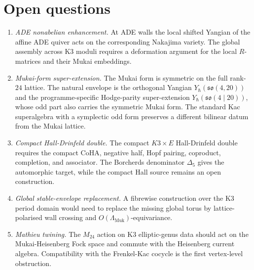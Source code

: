 \documentclass[11pt]{article}
\theoremstyle{definition}
\newcommand{\Lmuk}{\Lambda_{\mathrm{Muk}}}
\begin{document}
\section{Open questions}
\label{sec:open-questions}

\begin{enumerate}
\item \emph{ADE nonabelian enhancement.}
At ADE walls the local shifted Yangian of the affine ADE quiver acts on
the corresponding Nakajima variety. The global assembly across K3 moduli
requires a deformation argument for the local $R$-matrices and their
Mukai embeddings.

\item \emph{Mukai-form super-extension.}
The Mukai form is symmetric on the full rank-$24$ lattice. The natural
envelope is the orthogonal Yangian $Y_\hbar(\mathfrak{so}(4,20))$ and
the programme-specific Hodge-parity super-extension
$Y_\hbar(\mathfrak{so}(4\mid20))$, whose odd part also carries the
symmetric Mukai form. The standard Kac superalgebra with a symplectic odd
form preserves a different bilinear datum from the Mukai lattice.

\item \emph{Compact Hall-Drinfeld double.}
The compact $K3\times E$ Hall-Drinfeld double requires the compact CoHA,
negative half, Hopf pairing, coproduct, completion, and associator. The
Borcherds denominator $\Delta_5$ gives the automorphic target, while the
compact Hall source remains an open construction.

\item \emph{Global stable-envelope replacement.}
A fibrewise construction over the K3 period domain would need to replace
the missing global torus by lattice-polarised wall crossing and
$O(\Lmuk)$-equivariance.

\item \emph{Mathieu twining.}
The $M_{24}$ action on K3 elliptic-genus data should act on the
Mukai-Heisenberg Fock space and commute with the Heisenberg current
algebra. Compatibility with the Frenkel-Kac cocycle is the first
vertex-level obstruction.
\end{enumerate}
\end{document}
